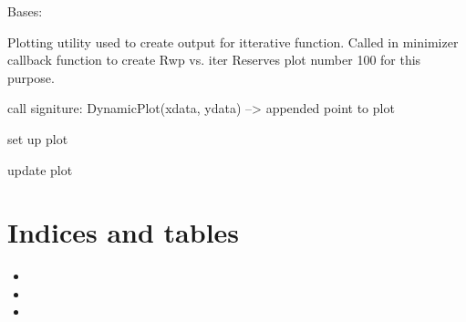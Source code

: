 \documentclass[letterpaper,10pt,english]{sphinxmanual}
\begin{document}
\begin{fulllineitems}
Bases: 

Plotting utility used to create output for itterative function.
Called in minimizer callback function to create Rwp  vs.  iter
Reserves plot number 100 for this purpose.

call signiture: DynamicPlot(xdata, ydata) --\textgreater{} appended point to plot

\begin{fulllineitems}
\end{fulllineitems}


\begin{fulllineitems}
set up plot

\end{fulllineitems}


\begin{fulllineitems}
update plot

\end{fulllineitems}


\end{fulllineitems}



\chapter{Indices and tables}
\label{\detokenize{index:indices-and-tables}}\begin{itemize}
\item {} 

\item {} 

\item {} 

\end{itemize}
\end{document}

